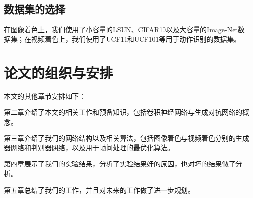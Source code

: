 \subsection{数据集的选择}
\label{sec:1-dataset}

  在图像着色上，我们使用了小容量的LSUN、CIFAR10以及大容量的Image-Net数据集；在视频着色上，我们使用了UCF11和UCF101等用于动作识别的数据集。

\section{论文的组织与安排}
\label{sec:1-org}

  本文的其他章节安排如下：

  第二章介绍了本文的相关工作和预备知识，包括卷积神经网络与生成对抗网络的概念。

  第三章介绍了我们的网络结构以及相关算法，包括图像着色与视频着色分别的生成器网络和判别器网络，以及用于帧间处理的最优化算法。

  第四章展示了我们的实验结果，分析了实验结果好的原因，也对坏的结果做了分析。

  第五章总结了我们的工作，并且对未来的工作做了进一步规划。